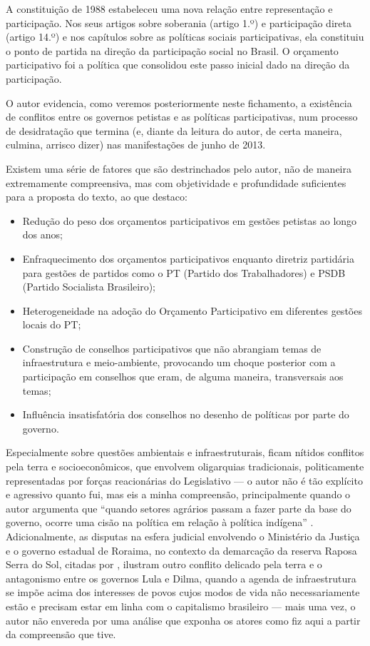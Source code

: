 \documentclass[
article,			%
11pt,				%
oneside,			%
a4paper,			%
english,			%
brazil,				%
sumario=tradicional
]{abntex2}
\begin{document}
	\begin{citacao}
		A constituição de 1988 estabeleceu uma nova relação entre representação e participação. Nos seus artigos sobre soberania (artigo 1.º) e participação direta (artigo 14.º) e nos capítulos sobre as políticas sociais participativas, ela constituiu o ponto de partida na direção da participação social no Brasil. O orçamento participativo foi a política que consolidou este passo inicial dado na direção da participação.
	\end{citacao}
	
	O autor evidencia, como veremos posteriormente neste fichamento, a existência de conflitos entre os governos petistas e as políticas participativas, num processo de desidratação que termina (e, diante da leitura do autor, de certa maneira, culmina, arrisco dizer) nas manifestações de junho de 2013.
	
	Existem uma série de fatores que são destrinchados pelo autor, não de maneira extremamente compreensiva, mas com objetividade e profundidade suficientes para a proposta do texto, ao que destaco:
	
	\begin{itemize}
		\item Redução do peso dos orçamentos participativos em gestões petistas ao longo dos anos;
		\item Enfraquecimento dos orçamentos participativos enquanto diretriz partidária para gestões de partidos como o PT (Partido dos Trabalhadores) e PSDB (Partido Socialista Brasileiro);
		\item Heterogeneidade na adoção do Orçamento Participativo em diferentes gestões locais do PT;
		\item Construção de conselhos participativos que não abrangiam temas de infraestrutura e meio-ambiente, provocando um choque posterior com a participação em conselhos que eram, de alguma maneira, transversais aos temas;
		\item Influência insatisfatória dos conselhos no desenho de políticas por parte do governo.
	\end{itemize}

	Especialmente sobre questões ambientais e infraestruturais, ficam nítidos conflitos pela terra e socioeconômicos, que envolvem oligarquias tradicionais, politicamente representadas por forças reacionárias do Legislativo --- o autor não é tão explícito e agressivo quanto fui, mas eis a minha compreensão, principalmente quando o autor argumenta que ``quando setores agrários passam a fazer parte da base do governo, ocorre uma cisão na política em relação à política indígena'' \cite{avritzer2018a}. Adicionalmente, as disputas na esfera judicial envolvendo o Ministério da Justiça e o governo estadual de Roraima, no contexto da demarcação da reserva Raposa Serra do Sol, citadas por , ilustram outro conflito delicado pela terra e o antagonismo entre os governos Lula e Dilma, quando a agenda de infraestrutura se impõe acima dos interesses de povos cujos modos de vida não necessariamente estão e precisam estar em linha com o capitalismo brasileiro --- mais uma vez, o autor não envereda por uma análise que exponha os atores como fiz aqui a partir da compreensão que tive.
	
\end{document}
